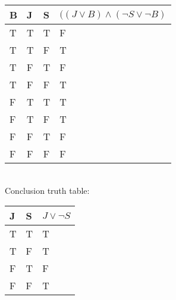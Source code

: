 \begin{solution}
\begin{enumerate}[label=(\alph*)]
{            \begin{tabular}[c]{l l l | l}
            B & J & S & $((J \vee B) \wedge (\neg S \vee \neg B)$ \\ \hline
            T & T & T & F \\
            T & T & F & T \\
            T & F & T & F \\
            T & F & F & T \\
            F & T & T & T \\
            F & T & F & T \\
            F & F & T & F \\
            F & F & F & F
            \end{tabular}
            \\
            Conclusion truth table: \\
            \begin{tabular}[c]{l l | l}
                J & S & $J \vee \neg S$ \\ \hline
                T & T & T \\
                T & F & T \\
                F & T & F \\
                F & F & T
            \end{tabular}
            
}
\end{enumerate}
\end{solution}
